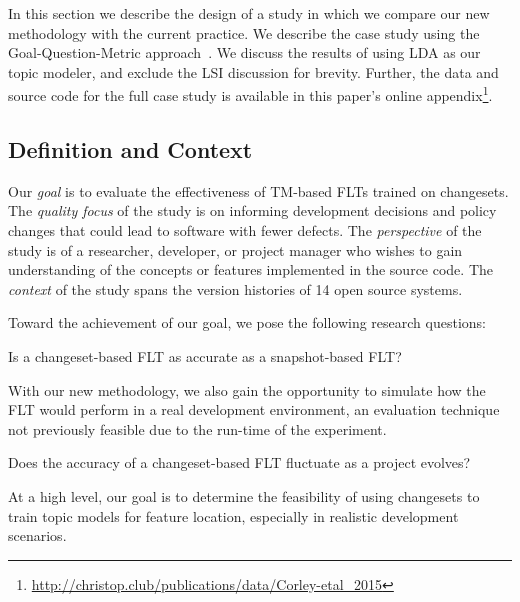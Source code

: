 
In this section we describe the design of a study in which we compare our new
methodology with the current practice. We describe the case study using the
Goal-Question-Metric approach~\cite{Basili-etal_1994}. We discuss the results of
using LDA as our topic modeler, and exclude the LSI discussion for brevity.
Further, the data and source code for the full case study is available in this
paper's online
appendix\footnote{\url{http://christop.club/publications/data/Corley-etal_2015}}.

\subsection{Definition and Context}

Our \textit{goal} is to evaluate the effectiveness of TM-based FLTs trained on
changesets. The \textit{quality focus} of the study is on informing development
decisions and policy changes that could lead to software with fewer defects.
The \textit{perspective} of the study is of a researcher, developer, or project
manager who wishes to gain understanding of the concepts or features implemented
in the source code. The \textit{context} of the study spans the version
histories of 14 open source systems.


Toward the achievement of our goal, we pose the following research questions:
\begin{description}[font=\itshape\mdseries,leftmargin=10mm,style=sameline]
    \item[RQ1] Is a changeset-based FLT as accurate as a snapshot-based FLT?
\end{description}

With our new methodology, we also gain the opportunity to simulate how the FLT
would perform in a real development environment, an evaluation technique not
previously feasible due to the run-time of the experiment.

\begin{description}[font=\itshape\mdseries,leftmargin=10mm,style=sameline]
    \item[RQ2] Does the accuracy of a changeset-based FLT fluctuate as a project evolves?
\end{description}

At a high level, our goal is to determine the feasibility of using changesets to
train topic models for feature location, especially in realistic development
scenarios.

